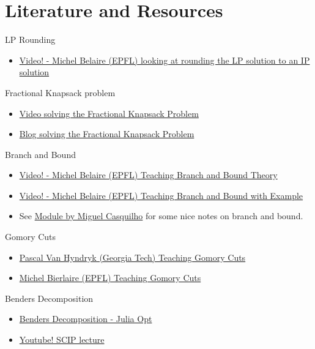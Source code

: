 \section{Literature and Resources}

\begin{resource}
LP Rounding
\begin{itemize}
\item  \href{https://youtu.be/Az7HUuq4SOI?t=189}{Video! - Michel Belaire (EPFL) looking at rounding the LP solution to an IP solution}
\end{itemize}

Fractional Knapsack problem
\begin{itemize}
\item \href{https://youtu.be/m1p-eWxrt6g}{Video solving the Fractional Knapsack Problem}
\item \href{https://www.geeksforgeeks.org/fractional-knapsack-problem/}{Blog solving the Fractional Knapsack Problem}
\end{itemize}

Branch and Bound
\begin{itemize}
\item \href{https://www.youtube.com/watch?v=SdXPNaID-T8}{Video! -  Michel Belaire (EPFL) Teaching Branch and Bound Theory}
\item \href{https://www.youtube.com/watch?v=nKXZYQUtvAY}{Video! -  Michel Belaire (EPFL) Teaching Branch and Bound with Example}
\item See \href{http://web.tecnico.ulisboa.pt/mcasquilho/compute/_linpro/TaylorB_module_c.pdf}{Module by Miguel Casquilho} for some nice notes on branch and bound.
\end{itemize}

Gomory Cuts
\begin{itemize}
\item \href{https://www.youtube.com/watch?v=1i0rKtH_YPs&list=PLNMgVqt8MREx6Nex1Q9003vrZem-JXNvX&index=28&ab_channel=EducationalDocumentaries}{Pascal Van Hyndryk (Georgia Tech) Teaching Gomory Cuts}
\item \href{https://www.youtube.com/watch?v=VdXHGNDnjjo}{Michel Bierlaire (EPFL) Teaching Gomory Cuts}
\end{itemize}

Benders Decomposition
\begin{itemize}
\item \href{https://www.juliaopt.org/notebooks/Shuvomoy%20-%20Benders%20decomposition.html}{Benders Decomposition - Julia Opt}
\item \href{https://www.youtube.com/watch?v=8vUNXHwVnC8}{Youtube!  SCIP lecture}
\end{itemize}
\end{resource}

